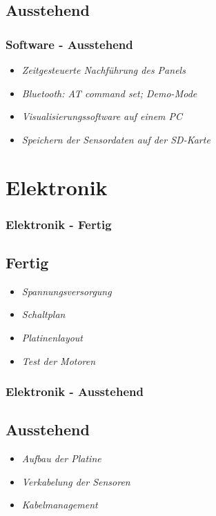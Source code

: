 \documentclass{beamer}
\begin{document}
\subsection{Ausstehend}
\begin{frame}
  \frametitle{Software - Ausstehend}
  \begin{itemize}
  \item \emph{Zeitgesteuerte Nachführung des Panels}
  \item \emph{Bluetooth: AT command set; Demo-Mode}
  \item \emph{Visualisierungssoftware auf einem PC}
  \item \emph{Speichern der Sensordaten auf der SD-Karte}
  \end{itemize}
\end{frame}

\section{Elektronik}
\begin{frame}
  \frametitle{Elektronik - Fertig}
  \subsection{Fertig}
        
  \begin{itemize}
  \item \emph{Spannungsversorgung}
  \item \emph{Schaltplan}
  \item \emph{Platinenlayout}
  \item \emph{Test der Motoren}
  \end{itemize}
\end{frame}

\begin{frame}
  \frametitle{Elektronik - Ausstehend}
  \subsection{Ausstehend}
  \begin{itemize}
  \item \emph{Aufbau der Platine}
  \item \emph{Verkabelung der Sensoren}
  \item \emph{Kabelmanagement}
  \end{itemize}
\end{frame}
    
\end{document}
